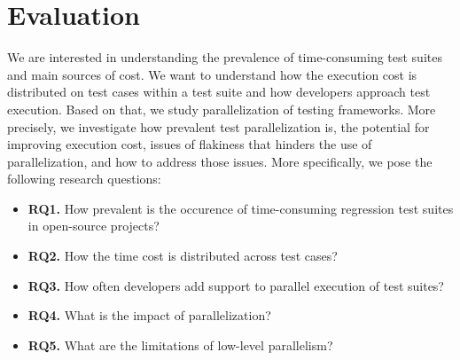 \section{Evaluation}
\label{sec:eval}

We are interested in understanding the prevalence of time-consuming
test suites and main sources of cost. We want to understand how the
execution cost is distributed on test cases within a test suite and
how developers approach test execution. Based on that, we study
parallelization of testing frameworks.  More precisely, we investigate
how prevalent test parallelization is, the potential for improving
execution cost, issues of flakiness that hinders the use of
parallelization, and how to address those issues.  More specifically,
we pose the following research questions:

\newcommand{\numRQA}{RQ1}
\newcommand{\numRQB}{RQ2}
\newcommand{\numRQC}{RQ3}
\newcommand{\numRQD}{RQ4}
\newcommand{\numRQF}{RQ5}

\newcommand{\RQA}{How prevalent is the occurence of time-consuming
  regression test suites in open-source projects?}
\newcommand{\RQB}{How the time cost is distributed across test cases?}
\newcommand{\RQC}{How often developers add support to parallel
execution of test suites?}
\newcommand{\RQD}{What is the impact of parallelization?}
\newcommand{\RQF}{What are the limitations of low-level parallelism?}

\begin{itemize}
    \item \textbf{\numRQA.} \RQA
    \item \textbf{\numRQB.} \RQB
    \item \textbf{\numRQC.} \RQC
    \item \textbf{\numRQD.} \RQD
    \item \textbf{\numRQF.} \RQF
\end{itemize}



